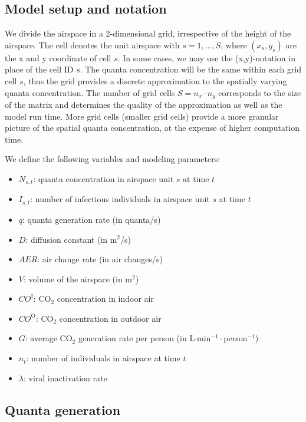 \documentclass[fleqn,11pt]{wlscirep_supp}
\begin{document}
\subsection{Model setup and notation}

We divide the airspace in a 2-dimensional grid, irrespective of the height of the airspace. The cell denotes the unit airspace with $s = 1, \dots, S$, where $(x_s, y_s)$ are the x and y coordinate of cell $s$. In some cases, we may use the (x,y)-notation in place of the cell ID $s$. The quanta concentration will be the same within each grid cell $s$, thus the grid provides a discrete approximation to the spatially varying quanta concentration. The number of grid cells $S = n_x \cdot n_y$ corresponds to the size of the matrix and determines the quality of the approximation as well as the model run time. More grid cells (smaller grid cells) provide a more granular picture of the spatial quanta concentration, at the expense of higher computation time. 

We define the following variables and modeling parameters:
\begin{itemize}
    \item $N_{s,t}$: quanta concentration in airspace unit $s$ at time $t$
    \item $I_{s,t}$: number of infectious individuals in airspace unit $s$ at time $t$
    \item $q$: quanta generation rate (in quanta/s)
    \item $D$: diffusion constant (in m$^2$/s)
    \item $AER$: air change rate (in air changes/s)
    \item $V$: volume of the airspace (in m$^2$)
    \item $CO^{\text{I}}$: CO$_2$ concentration in indoor air
    \item $CO^{\text{O}}$: CO$_2$ concentration in outdoor air
    \item $G$: average CO$_2$ generation rate per person (in L$\cdot$min$^{-1}\cdot$person$^{-1}$)
    \item $n_t$: number of individuals in airspace at time $t$
    \item $\lambda$: viral inactivation rate
\end{itemize}

\subsection{Quanta generation}\label{sec:quanta-generation}
\end{document}
